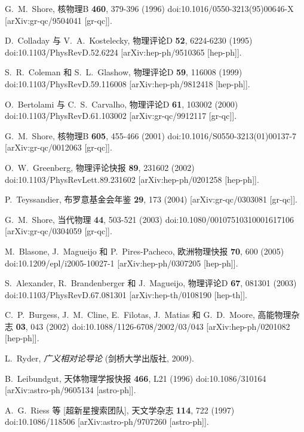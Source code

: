 \documentclass[jkps,preprint,fleqn]{revtex4}
\begin{document}
\begin{thebibliography}{999}
G.~M.~Shore,  
核物理B \textbf{460}, 379-396 (1996)  
doi:10.1016/0550-3213(95)00646-X  
[arXiv:gr-qc/9504041 [gr-qc]].  

D.~Colladay 与 V.~A.~Kostelecky,  
物理评论D \textbf{52}, 6224-6230 (1995)  
doi:10.1103/PhysRevD.52.6224  
[arXiv:hep-ph/9510365 [hep-ph]].  

S.~R.~Coleman 和 S.~L.~Glashow,  
物理评论D \textbf{59}, 116008 (1999)  
doi:10.1103/PhysRevD.59.116008  
[arXiv:hep-ph/9812418 [hep-ph]].  

O.~Bertolami 与 C.~S.~Carvalho,  
物理评论D \textbf{61}, 103002 (2000)  
doi:10.1103/PhysRevD.61.103002  
[arXiv:gr-qc/9912117 [gr-qc]].  

G.~M.~Shore,  
核物理B \textbf{605}, 455-466 (2001)  
doi:10.1016/S0550-3213(01)00137-7  
[arXiv:gr-qc/0012063 [gr-qc]].  

O.~W.~Greenberg,  
物理评论快报 \textbf{89}, 231602 (2002)  
doi:10.1103/PhysRevLett.89.231602  
[arXiv:hep-ph/0201258 [hep-ph]].  

P.~Teyssandier,  
布罗意基金会年鉴 \textbf{29}, 173 (2004)  
[arXiv:gr-qc/0303081 [gr-qc]].  

G.~M.~Shore,  
当代物理 \textbf{44}, 503-521 (2003)  
doi:10.1080/00107510310001617106  
[arXiv:gr-qc/0304059 [gr-qc]].  

M.~Blasone, J.~Magueijo 和 P.~Pires-Pacheco,  
欧洲物理快报 \textbf{70}, 600 (2005)  
doi:10.1209/epl/i2005-10027-1  
[arXiv:hep-ph/0307205 [hep-ph]].  

S.~Alexander, R.~Brandenberger 和 J.~Magueijo,  
物理评论D \textbf{67}, 081301 (2003)  
doi:10.1103/PhysRevD.67.081301  
[arXiv:hep-th/0108190 [hep-th]].  

C.~P.~Burgess, J.~M.~Cline, E.~Filotas, J.~Matias 和 G.~D.~Moore,  
高能物理杂志 \textbf{03}, 043 (2002)  
doi:10.1088/1126-6708/2002/03/043  
[arXiv:hep-ph/0201082 [hep-ph]].  

L.~Ryder, \textit{广义相对论导论} (剑桥大学出版社, 2009).  

B.~Leibundgut,  
天体物理学报快报 \textbf{466}, L21 (1996)  
doi:10.1086/310164  
[arXiv:astro-ph/9605134 [astro-ph]].  

A.~G.~Riess 等 [超新星搜索团队],  
天文学杂志 \textbf{114}, 722 (1997)  
doi:10.1086/118506  
[arXiv:astro-ph/9707260 [astro-ph]].  


\end{thebibliography}
\end{document}
